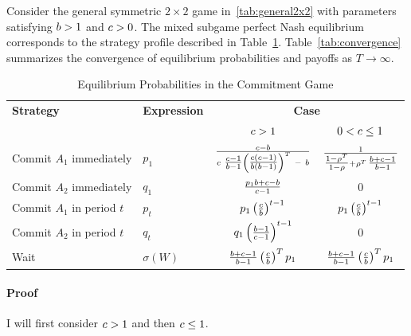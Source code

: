 \documentclass[main.tex]{subfiles}
\begin{document}
\begin{lemma}\label{lem:convergence}
    Consider the general symmetric $2\times2$ game in~\autoref{tab:general2x2} with parameters satisfying $b>1$ and $c>0$. The mixed subgame perfect Nash equilibrium corresponds to the strategy profile described in Table~\ref{tab:lemma4-probabilities}. Table~\ref{tab:convergence} summarizes the convergence of equilibrium probabilities and payoffs as $T\to\infty$.
\end{lemma}
\begin{table}[ht]
\centering
\begin{tabular}{llcc}
\toprule
\textbf{Strategy} & \textbf{Expression} & \multicolumn{2}{c}{\textbf{Case}} \\
& & $c > 1$ & $0 < c \leq 1$ \\
\midrule
Commit $A_1$ immediately & 
$p_1$ &
$\tfrac{\cparam - \bparam}{\cparam\ \tfrac{\cparam-1}{\bparam-1} \left( \tfrac{\cparam(\cparam - 1)}{\bparam(\bparam - 1)} \right)^T\ -\ b }$ &
$\tfrac{1}{\tfrac{1 - \rho^{T}}{1 - \rho} + \rho^{T}\,\tfrac{b + c - 1}{b - 1}}$ \\
[4ex]
 
Commit $A_2$ immediately & 
$q_1$ &
$\tfrac{p_1 b + c - b}{c - 1}$ &
$0$ \\
[3ex]
 
Commit $A_1$ in period $t$ & 
$p_t$ &
$p_1 \left( \tfrac{c}{b} \right)^{t - 1}$ &
$p_1 \left( \tfrac{c}{b} \right)^{t - 1}$ \\
[3ex]
 
Commit $A_2$ in period $t$ & 
$q_t$ &
$q_1 \left( \tfrac{b - 1}{c - 1} \right)^{t - 1}$ &
$0$ \\
[3ex]
 
Wait & 
$\sigma(W)$ &
$\tfrac{b + c - 1}{b-1} \left( \tfrac{c}{b} \right)^T p_1$ &
$\tfrac{b + c - 1}{b-1} \left( \tfrac{c}{b} \right)^T p_1$ \\
\bottomrule
\end{tabular}
\caption{Equilibrium Probabilities in the Commitment Game}
\label{tab:lemma4-probabilities}
\end{table}
\paragraph{Proof}
I will first consider $c>1$ and then $c\leq1$.
 
\end{document}
